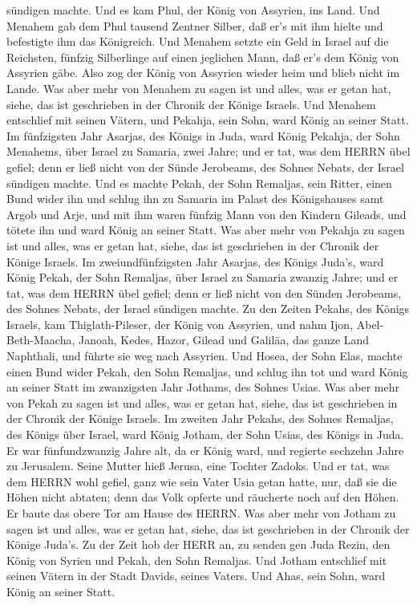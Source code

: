 sündigen machte.  Und es kam Phul, der König von Assyrien,
ins Land. Und Menahem gab dem Phul tausend Zentner Silber, daß er's mit
ihm hielte und befestigte ihm das Königreich.  Und Menahem
setzte ein Geld in Israel auf die Reichsten, fünfzig Silberlinge auf
einen jeglichen Mann, daß er's dem König von Assyrien gäbe. Also zog der
König von Assyrien wieder heim und blieb nicht im Lande. 
Was aber mehr von Menahem zu sagen ist und alles, was er getan hat,
siehe, das ist geschrieben in der Chronik der Könige Israels.
 Und Menahem entschlief mit seinen Vätern, und Pekahja,
sein Sohn, ward König an seiner Statt.  Im fünfzigsten Jahr
Asarjas, des Königs in Juda, ward König Pekahja, der Sohn Menahems, über
Israel zu Samaria, zwei Jahre;  und er tat, was dem HERRN
übel gefiel; denn er ließ nicht von der Sünde Jerobeams, des Sohnes
Nebats, der Israel sündigen machte.  Und es machte Pekah,
der Sohn Remaljas, sein Ritter, einen Bund wider ihn und schlug ihn zu
Samaria im Palast des Königshauses samt Argob und Arje, und mit ihm
waren fünfzig Mann von den Kindern Gileads, und tötete ihn und ward
König an seiner Statt.  Was aber mehr von Pekahja zu sagen
ist und alles, was er getan hat, siehe, das ist geschrieben in der
Chronik der Könige Israels.  Im zweiundfünfzigsten Jahr
Asarjas, des Königs Juda's, ward König Pekah, der Sohn Remaljas, über
Israel zu Samaria zwanzig Jahre;  und er tat, was dem HERRN
übel gefiel; denn er ließ nicht von den Sünden Jerobeams, des Sohnes
Nebats, der Israel sündigen machte.  Zu den Zeiten Pekahs,
des Königs Israels, kam Thiglath-Pileser, der König von Assyrien, und
nahm Ijon, Abel-Beth-Maacha, Janoah, Kedes, Hazor, Gilead und Galiläa,
das ganze Land Naphthali, und führte sie weg nach Assyrien.
 Und Hosea, der Sohn Elas, machte einen Bund wider Pekah,
den Sohn Remaljas, und schlug ihn tot und ward König an seiner Statt im
zwanzigsten Jahr Jothams, des Sohnes Usias.  Was aber mehr
von Pekah zu sagen ist und alles, was er getan hat, siehe, das ist
geschrieben in der Chronik der Könige Israels.  Im zweiten
Jahr Pekahs, des Sohnes Remaljas, des Königs über Israel, ward König
Jotham, der Sohn Usias, des Königs in Juda.  Er war
fünfundzwanzig Jahre alt, da er König ward, und regierte sechzehn Jahre
zu Jerusalem. Seine Mutter hieß Jerusa, eine Tochter Zadoks.
 Und er tat, was dem HERRN wohl gefiel, ganz wie sein Vater
Usia getan hatte,  nur, daß sie die Höhen nicht abtaten;
denn das Volk opferte und räucherte noch auf den Höhen. Er baute das
obere Tor am Hause des HERRN.  Was aber mehr von Jotham zu
sagen ist und alles, was er getan hat, siehe, das ist geschrieben in der
Chronik der Könige Juda's.  Zu der Zeit hob der HERR an, zu
senden gen Juda Rezin, den König von Syrien und Pekah, den Sohn
Remaljas.  Und Jotham entschlief mit seinen Vätern in der
Stadt Davids, seines Vaters. Und Ahas, sein Sohn, ward König an seiner
Statt.

